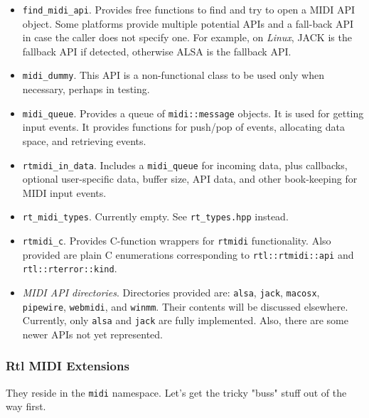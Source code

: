    \begin{itemize}
      \item \texttt{find\_midi\_api}.
         Provides free functions to find and try to open a MIDI API object.
         Some platforms provide multiple potential APIs and a fall-back
         API in case the caller does not specify one. For example,
         on \textsl{Linux}, JACK is the fallback API if detected, otherwise
         ALSA is the fallback API.
      \item \texttt{midi\_dummy}.
         This API is a non-functional class to be used only when necessary,
         perhaps in testing.
      \item \texttt{midi\_queue}.
         Provides a queue of \texttt{midi::message} objects.
         It is used for getting input events.
         It provides functions for push/pop of events, allocating data space,
         and retrieving events.
      \item \texttt{rtmidi\_in\_data}.
         Includes a \texttt{midi\_queue} for incoming data, plus
         callbacks, optional user-specific data, buffer size, API data, and
         other book-keeping for MIDI input events.
      \item \texttt{rt\_midi\_types}.
         Currently empty. See \texttt{rt\_types.hpp} instead.
      \item \texttt{rtmidi\_c}.
         Provides C-function wrappers for \texttt{rtmidi} functionality.
         Also provided are plain C enumerations corresponding to
         \texttt{rtl::rtmidi::api} and
         \texttt{rtl::rterror::kind}.
      \item \textsl{MIDI API directories}.
         Directories provided are:
         \texttt{alsa},
         \texttt{jack},
         \texttt{macosx},
         \texttt{pipewire},
         \texttt{webmidi}, and
         \texttt{winmm}.
         Their contents will be discussed elsewhere.
         Currently, only \texttt{alsa} and \texttt{jack} are fully implemented.
         Also, there are some newer APIs not yet represented.
   \end{itemize}

\subsubsection{Rtl MIDI Extensions}
\label{subsubsec:rtl_midi_extensions}

   They reside in the \texttt{midi} namespace.
   Let's get the tricky "buss" stuff out of the way first.

